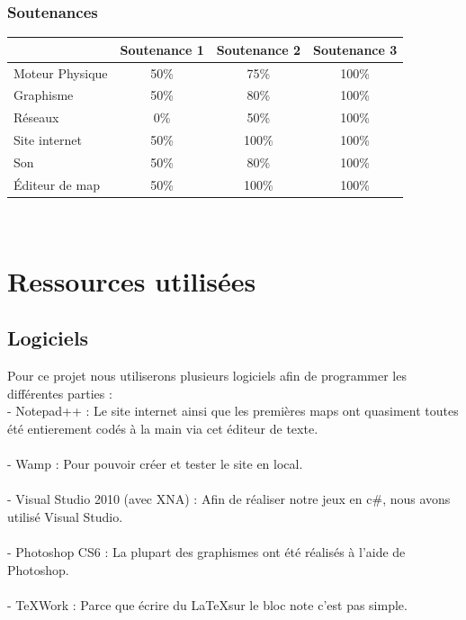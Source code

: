 \documentclass [11pt]{report}
\begin{document}
		\subsection{Soutenances}
			\begin{tabular}{| l | * {3}{c|}}
				\hline
		 		& Soutenance 1 & Soutenance 2 & Soutenance 3 \\
				\hline
				Moteur Physique & 50\% & 75\% & 100\% \\
				\hline
				 Graphisme & 50\% & 80\% & 100\% \\
				\hline
				Réseaux & 0\% & 50\% & 100\% \\
				\hline
				Site internet & 50\% & 100\%  & 100\%  \\
	          			 \hline
				Son & 50\% & 80\% & 100\% \\
				\hline
				\'Editeur de map & 50\% & 100\% & 100\% \\
				\hline
			\end{tabular}\\\vspace{4mm}


\chapter {Ressources utilisées}
	\section {Logiciels}

	Pour ce projet nous utiliserons plusieurs logiciels afin de programmer les différentes parties :\\

	- Notepad++ : Le site internet ainsi que les premières maps ont quasiment toutes été entierement codés à la main via cet éditeur de texte.\\\\\indent
	- Wamp : Pour pouvoir créer et tester le site en local.\\\\\indent
	- Visual Studio 2010 (avec XNA) : Afin de réaliser notre jeux en c\#, nous avons utilisé Visual Studio.\\\\\indent
	- Photoshop CS6 : La plupart des graphismes ont été réalisés à l'aide de Photoshop.\\\\\indent
	- TeXWork : Parce que écrire du \LaTeX sur le bloc note c'est pas simple.\\\vspace{8mm}
\end{document}
